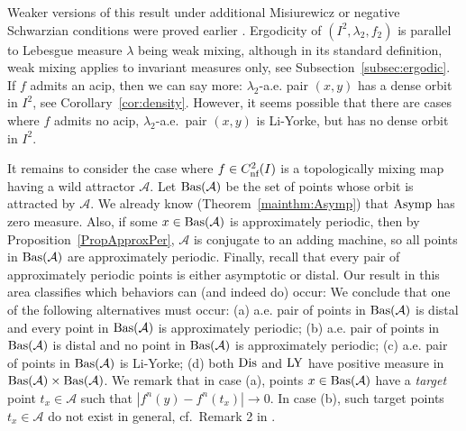 \documentclass[12pt, psamsfonts, reqno]{amsart}
\begin{document}
Weaker versions of this result under additional Misiurewicz or
negative Schwarzian conditions were proved earlier \cite{BaJi1,
BrJi}. Ergodicity of $(I^2, \lambda_2, f_2)$ is parallel to
Lebesgue measure $\lambda$ being weak mixing, although in its
standard definition, weak mixing applies to invariant measures
only, see Subsection~\ref{subsec:ergodic}. If $f$ admits an acip,
then we can say more: $\lambda_2$-a.e. pair $(x,y)$ has a dense
orbit in $I^2$, see Corollary~\ref{cor:density}. However, it seems
possible that there are cases where $f$ admits no acip,
$\lambda_2$-a.e.\ pair $(x,y)$ is Li-Yorke, but has no dense orbit
in $I^2$.

It remains to consider the case where $f\in {C^2_{\text{\rm nf}}}(I)$ is a
topologically mixing map having a wild attractor ${{\mathcal A}}$. Let
${\mathop{\rm Bas}\nolimits}({{\mathcal A}})$ be the set of points whose orbit is attracted by ${{\mathcal A}}$.
We already know (Theorem~\ref{mainthm:Asymp}) that ${\mathop{\rm Asymp}\nolimits}$ has
zero measure.  Also, if some $x \in {\mathop{\rm Bas}\nolimits}({{\mathcal A}})$ is approximately
periodic, then by Proposition~\ref{PropApproxPer}, ${{\mathcal A}}$ is
conjugate to an adding machine, so all points in ${\mathop{\rm Bas}\nolimits}({{\mathcal A}})$ are
approximately periodic. Finally, recall that every pair of
approximately periodic points is either asymptotic or distal. Our
result in this area classifies which behaviors can (and indeed do)
occur:
\iffalse We conclude that one of the following alternatives
must occur: (a) a.e. pair of points in ${\mathop{\rm Bas}\nolimits}({{\mathcal A}})$ is distal and
every point in ${\mathop{\rm Bas}\nolimits}({{\mathcal A}})$ is approximately periodic; (b) a.e. pair
of points in ${\mathop{\rm Bas}\nolimits}({{\mathcal A}})$ is distal and no point in ${\mathop{\rm Bas}\nolimits}({{\mathcal A}})$ is
approximately periodic; (c) a.e. pair of points in ${\mathop{\rm Bas}\nolimits}({{\mathcal A}})$ is
Li-Yorke; (d) both ${\mathop{\rm Dis}\nolimits}$ and ${\mathop{\rm LY}\nolimits}$ have positive measure in
${\mathop{\rm Bas}\nolimits}({{\mathcal A}})\times {\mathop{\rm Bas}\nolimits}({{\mathcal A}})$. We remark that in case (a), points
$x\in {\mathop{\rm Bas}\nolimits}({{\mathcal A}})$ have a \emph{target} point $t_x \in {{\mathcal A}}$ such that
$|f^n(y)-f^n(t_x)| \to 0$. In case (b), such target points $t_x
\in {{\mathcal A}}$ do not exist in general, cf.\ Remark 2 in \cite{BrHaw}.
\end{document}
